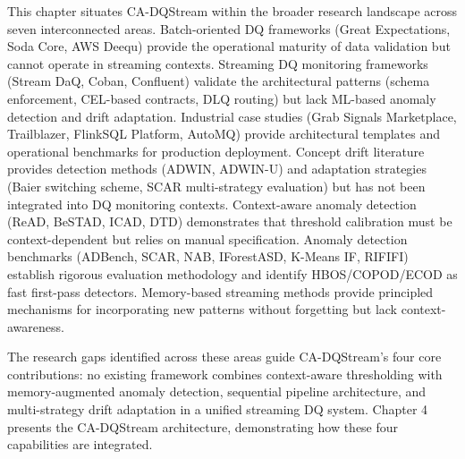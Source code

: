 This chapter situates CA-DQStream within the broader research landscape across seven interconnected areas. Batch-oriented DQ frameworks (Great Expectations, Soda Core, AWS Deequ) provide the operational maturity of data validation but cannot operate in streaming contexts. Streaming DQ monitoring frameworks (Stream DaQ, Coban, Confluent) validate the architectural patterns (schema enforcement, CEL-based contracts, DLQ routing) but lack ML-based anomaly detection and drift adaptation. Industrial case studies (Grab Signals Marketplace, Trailblazer, FlinkSQL Platform, AutoMQ) provide architectural templates and operational benchmarks for production deployment. Concept drift literature provides detection methods (ADWIN, ADWIN-U) and adaptation strategies (Baier switching scheme, SCAR multi-strategy evaluation) but has not been integrated into DQ monitoring contexts. Context-aware anomaly detection (ReAD, BeSTAD, ICAD, DTD) demonstrates that threshold calibration must be context-dependent but relies on manual specification. Anomaly detection benchmarks (ADBench, SCAR, NAB, IForestASD, K-Means IF, RIFIFI) establish rigorous evaluation methodology and identify HBOS/COPOD/ECOD as fast first-pass detectors. Memory-based streaming methods provide principled mechanisms for incorporating new patterns without forgetting but lack context-awareness.

The research gaps identified across these areas guide CA-DQStream's four core contributions: no existing framework combines context-aware thresholding with memory-augmented anomaly detection, sequential pipeline architecture, and multi-strategy drift adaptation in a unified streaming DQ system. Chapter 4 presents the CA-DQStream architecture, demonstrating how these four capabilities are integrated.
